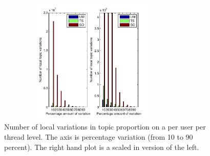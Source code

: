 \documentclass{sig-alternate}
\begin{document}
\begin{figure}
\begin{center}
\includegraphics[height=6cm,width=9cm]{TopicVariationsLocal.pdf}
\end{center}
\caption{\small{Number of local variations in topic proportion on a per user per thread
level. The axis is percentage variation (from 10 to 90 percent). The right hand
plot is a scaled in version of the left.}}
\label{fig:localTopicVariations}
\end{figure}
\end{document}
